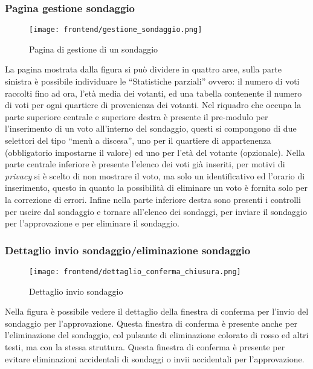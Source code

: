     \subsubsection{Pagina gestione sondaggio}
        \begin{figure}[H]
            \centering
            \texttt{[image: frontend/gestione\_sondaggio.png]}
            \caption{Pagina di gestione di un sondaggio}
            \label{fig:frontend-gestione-sondaggio}
        \end{figure}
        La pagina mostrata dalla figura  si può dividere in quattro aree, sulla parte sinistra è possibile individuare le ``Statistiche parziali'' ovvero: il numero di voti raccolti fino ad ora, l'età media dei votanti, ed una tabella contenente il numero di voti per ogni quartiere di provenienza dei votanti. Nel riquadro che occupa la parte superiore centrale e superiore destra è presente il pre-modulo per l'inserimento di un voto all'interno del sondaggio, questi si compongono di due selettori del tipo ``menù a discesa'', uno per il quartiere di appartenenza (obbligatorio impostarne il valore) ed uno per l'età del votante (opzionale). Nella parte centrale inferiore è presente l'elenco dei voti già inseriti, per motivi di \textit{privacy} si è scelto di non mostrare il voto, ma solo un identificativo ed l'orario di inserimento, questo in quanto la possibilità di eliminare un voto è fornita solo per la correzione di errori. Infine nella parte inferiore destra sono presenti i controlli per uscire dal sondaggio e tornare all'elenco dei sondaggi, per inviare il sondaggio per l'approvazione e per eliminare il sondaggio.
    \subsubsection{Dettaglio invio sondaggio/eliminazione sondaggio}
        \begin{figure}[H]
            \centering
            \texttt{[image: frontend/dettaglio\_conferma\_chiusura.png]}
            \caption{Dettaglio invio sondaggio}
            \label{fig:frontend-conferma-chiusura}
        \end{figure}
        Nella figura  è possibile vedere il dettaglio della finestra di conferma per l'invio del sondaggio per l'approvazione. Questa finestra di conferma è presente anche per l'eliminazione del sondaggio, col pulsante di eliminazione colorato di rosso ed altri testi, ma con la stessa struttura. Questa finestra di conferma è presente per evitare eliminazioni accidentali di sondaggi o invii accidentali per l'approvazione.
